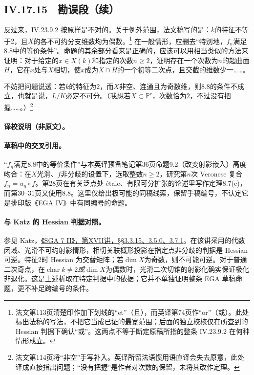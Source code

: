 \subsection*{IV.17.15　勘误段（续）}
\begingroup
\def\OO{\mathcal O}\def\m{\mathfrak m}\def\mm{\mathfrak m}\def\Sym{\operatorname{Sym}}
反过来，IV.23.9.2 按原样是不对的。关于例外范围，法文稿写的是：$k$的特征不等于$2$，且$X$的各不可约分支维数均为偶数。\footnote{法文第113页清楚印作加下划线的“et”（且），而英译第74页作“or”（或）。此处标出法稿的写法，不把它当成已证的最宽范围；后面的独立校核仅在所查到的 Hessian 判据下确认“或”。这两点不等于断定原稿所指的整条 IV.23.9.2 在何种情形成立。}
在一般情形，应删去“特别地，$f_n$满足8.8中的等价条件”。命题的其余部分看来是正确的，应该可以用相当类似的方法来证明：对于给定的$x\in X(k)$和指定的次数$n\ge2$，证明存在一个次数为$n$的超曲面$H$，它在$x$处与$X$相切，使$x$成为$X\cap H$的一个初等二次点，且交截的维数少一……。

不妨把问题说透：若$k$的特征为$2$，而$X$非空、连通且为奇数维，则8.8的条件不成立，也就是说，$L/K$必定不可分。（我想若$X\subset\mathbb P^r$，次数恰为$2$，不过没有把握……。）\footnote{法文第114页将“非空”手写补入。英译所留法语惯用语直译会失去原意，此处译成直接指出问题；“没有把握”是作者对次数的保留，未将其改作定理。}
\paragraph{译校说明（非原文）。}
\paragraph{草稿中的交叉引用。}
“$f_n$满足8.8中的等价条件”与本英译预备笔记第36页命题9.2（改变射影嵌入）高度吻合：在$X$光滑、$f$非分歧的设置下，选取整数$n\ge2$，研究第$n$次 Veronese 复合$f_n=u_n\circ f$。第28页在有关泛点处 étale、有限可分扩张的论述里写作定理8.7(c)，而第30--31页又使用8.8。这里仅给出极可能的同稿线索，保留手稿编号，不认定它是排印版《EGA IV》中有同编号的命题。

\paragraph{与 Katz 的 Hessian 判据对照。}
参见 Katz，\href{https://grothendiecksga.com/read/sga7/fr/17-3.html}{《SGA 7 II》，第XVII讲，§§3.3.15、3.5.0、3.7.1}。在该讲采用的代数闭域、光滑不可约射影情形，相切关联概形投影在指定点非分歧的判据是 Hessian 可逆。特征$2$时 Hessian 为交替矩阵；若$\dim X$为奇数，则不可能可逆。对于普通二次奇点，在$\operatorname{char}k\ne2$\emph{或}$\dim X$为偶数时，光滑二次切锥的射影化确实保证极化非退化。这是上述析取在特定判据中的依据；它并不单独证明整条 EGA 草稿命题，更不补足跨编号的条件。

